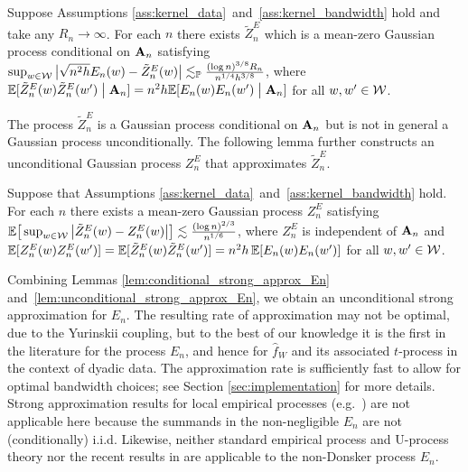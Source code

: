 \begin{lemma}
  \label{lem:conditional_strong_approx_En}

  Suppose Assumptions
  \ref{ass:kernel_data}~and~\ref{ass:kernel_bandwidth} hold
  and take any $R_n \to \infty$.
  For each $n$ there exists
  $\tilde Z^E_n$
  which is a mean-zero Gaussian process
  conditional on $\mathbf{A}_n$ satisfying
  $\sup_{w \in \mathcal{W}}
  \big| \sqrt{n^2h} E_n(w) - \tilde Z_n^E(w) \big|
  \lesssim_{\mathbb{P}} \frac{(\log n)^{3/8} R_n}{n^{1/4}h^{3/8}}$,
  where $\mathbb{E}[\tilde Z_n^E(w)\tilde Z_n^E(w')\bigm\vert \mathbf{A}_n]
  =n^2h\mathbb{E}[E_n(w)E_n(w')\bigm\vert \mathbf{A}_n]$
  for all $w, w' \in \mathcal{W}$.
\end{lemma}

The process $\tilde Z_n^E$
is a Gaussian process conditional on $\mathbf{A}_n$ but is not in general a
Gaussian process unconditionally.
The following lemma further constructs an unconditional Gaussian process
$Z_n^E$ that approximates $\tilde Z_n^E$.

\begin{lemma}
  \label{lem:unconditional_strong_approx_En}

  Suppose that Assumptions
  \ref{ass:kernel_data}~and~\ref{ass:kernel_bandwidth} hold.
  For each $n$ there exists
  a mean-zero Gaussian process $Z^E_n$ satisfying
  $\mathbb{E}\big[ \sup_{w \in \mathcal{W}} \big|\tilde Z_n^E(w) - Z_n^E(w)\big| \big]
  \lesssim \frac{(\log n)^{2/3}}{n^{1/6}}$,
  where
  $Z_n^E$ is independent of $\mathbf{A}_n$ and
  $\mathbb{E}[Z_n^E(w)Z_n^E(w')]=\mathbb{E}[\tilde Z_n^E(w)\tilde Z_n^E(w')]
  = n^2h \, \mathbb{E}[E_n(w)E_n(w')]$
  for all $w, w' \in \mathcal{W}$.
\end{lemma}


Combining Lemmas \ref{lem:conditional_strong_approx_En}
and~\ref{lem:unconditional_strong_approx_En},
we obtain an unconditional strong approximation for $E_n$.
The resulting rate of approximation may not be optimal,
due to the Yurinskii coupling, but to the best of our knowledge
it is the first in the literature for the process
$E_n$, and hence for $\hat{f}_W$ and its associated $t$-process in the
context of dyadic data.
The approximation rate is
sufficiently fast to allow for optimal bandwidth choices; see Section
\ref{sec:implementation} for more details.
Strong approximation results for local empirical processes
(e.g.\ \citealp{gine2010confidence})
are not applicable here because the summands in the
non-negligible $E_n$
are not (conditionally) i.i.d.
Likewise, neither standard empirical process and U-process theory
\citep{van1996weak,gine2021mathematical} nor the recent results in
\citet{davezies2021exchangeable} are applicable
to the non-Donsker process $E_n$.

